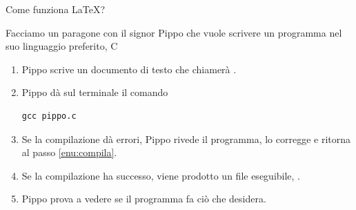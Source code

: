 \documentclass{beamer}
\begin{document}

\begin{frame}[fragile]{Come funziona \LaTeX?}

Facciamo un paragone con il signor Pippo che vuole scrivere un programma
nel suo linguaggio preferito, C

\bigskip{}
\begin{enumerate}
\item Pippo scrive un documento di testo che chiamer\`a .
\item \label{enu:compila}Pippo d\`a sul terminale il comando
\begin{verbatim}
gcc pippo.c
\end{verbatim}
\item Se la compilazione d\`a errori, Pippo rivede il programma, lo corregge
e ritorna al passo \ref{enu:compila}.
\item Se la compilazione ha successo, viene prodotto un file eseguibile,
.
\item Pippo prova a vedere se il programma fa ci\`o che desidera.
\end{enumerate}
\end{frame}
\end{document}
